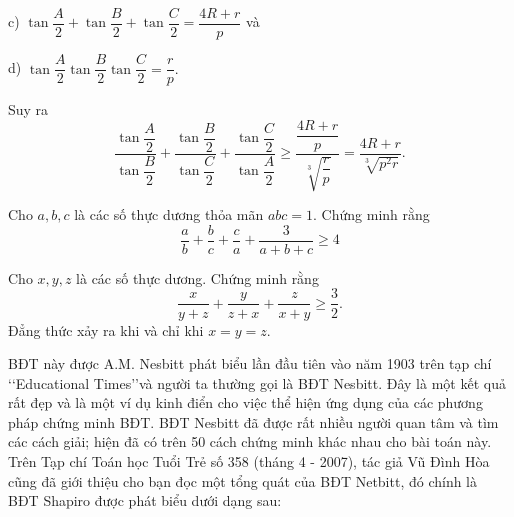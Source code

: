 {\begin{bt}
{		\noindent
		c) $\tan \dfrac{A}{2} + \tan \dfrac{B}{2} + \tan \dfrac{C}{2} = \dfrac{{4R + r}}{p}$ và 
		
		\noindent
		d) $\tan \dfrac{A}{2}\tan \dfrac{B}{2}\tan \dfrac{C}{2} = \dfrac{r}{p}.$
		
		\noindent
		Suy ra $$\frac{{\tan \dfrac{A}{2}}}{{\tan \dfrac{B}{2}}} + \frac{{\tan \dfrac{B}{2}}}{{\tan \dfrac{C}{2}}} + \frac{{\tan \dfrac{C}{2}}}{{\tan \dfrac{A}{2}}} \ge \frac{{\dfrac{{4R + r}}{p}}}{{\sqrt[3]{{\dfrac{r}{p}}}}} = \frac{{4R + r}}{{\sqrt[3]{{{p^2}r}}}}.$$
	}
\end{bt}
\begin{bt}%
	Cho $a, b, c$ là các số thực dương thỏa mãn  $abc=1$. Chứng minh rằng
	$$\frac{a}{b} + \frac{b}{c} + \frac{c}{a} + \frac{3}{{a + b + c}} \ge 4$$
\end{bt}

\begin{bt}%
	Cho $x, y, z$ là các số thực dương. Chứng minh rằng
	$$\frac{x}{{y + z}} + \frac{y}{{z + x}} + \frac{z}{{x + y}} \ge \frac{3}{2}.$$
	Đẳng thức xảy ra khi và chỉ khi $x = y = z$.
	
	\noindent
	BĐT này được A.M. Nesbitt phát biểu lần đầu tiên vào năm 1903 trên tạp chí \lq \lq Educational Times\rq \rq và người ta thường gọi là BĐT Nesbitt. Đây là một kết quả rất đẹp và là một ví dụ kinh điển cho việc thể hiện ứng dụng của các phương pháp chứng minh BĐT. BĐT Nesbitt đã được rất nhiều người quan tâm và tìm các cách giải; hiện đã có trên 50 cách chứng minh khác nhau cho bài toán này. Trên Tạp chí Toán học Tuổi Trẻ số 358 (tháng 4 - 2007), tác giả Vũ Đình Hòa cũng đã giới thiệu cho bạn đọc một tổng quát của BĐT Netbitt, đó chính là BĐT Shapiro được phát biểu dưới dạng sau:
	

\end{bt}}
